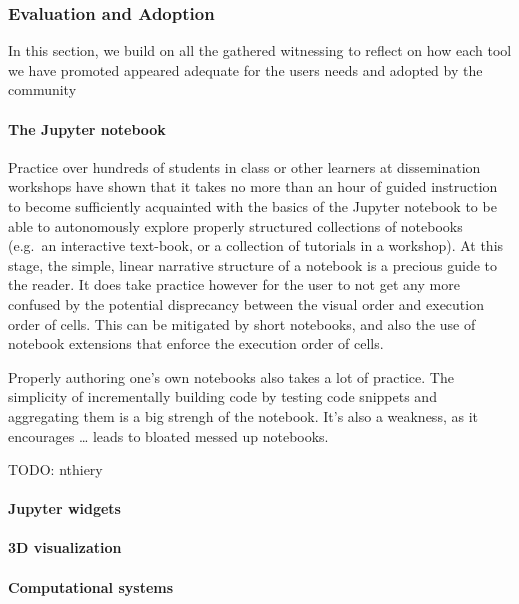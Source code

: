 \documentclass{deliverablereport}
\begin{document}
\hypertarget{evaluation-and-adoption}{%
\subsubsection{Evaluation and Adoption}\label{evaluation-and-adoption}}

In this section, we build on all the gathered witnessing to reflect on
how each tool we have promoted appeared adequate for the users needs and
adopted by the community

\hypertarget{the-jupyter-notebook}{%
\paragraph{The Jupyter notebook}\label{the-jupyter-notebook}}

Practice over hundreds of students in class or other learners at
dissemination workshops have shown that it takes no more than an hour of
guided instruction to become sufficiently acquainted with the basics of
the Jupyter notebook to be able to autonomously explore properly
structured collections of notebooks (e.g.~an interactive text-book, or a
collection of tutorials in a workshop). At this stage, the simple,
linear narrative structure of a notebook is a precious guide to the
reader. It does take practice however for the user to not get any more
confused by the potential disprecancy between the visual order and
execution order of cells. This can be mitigated by short notebooks, and
also the use of notebook extensions that enforce the execution order of
cells.

Properly authoring one's own notebooks also takes a lot of practice. The
simplicity of incrementally building code by testing code snippets and
aggregating them is a big strengh of the notebook. It's also a weakness,
as it encourages \ldots{} leads to bloated messed up notebooks.

TODO: nthiery

\hypertarget{jupyter-widgets}{%
\paragraph{Jupyter widgets}\label{jupyter-widgets}}

\hypertarget{d-visualization}{%
\paragraph{3D visualization}\label{d-visualization}}

\hypertarget{computational-systems}{%
\paragraph{Computational systems}\label{computational-systems}}
\end{document}
